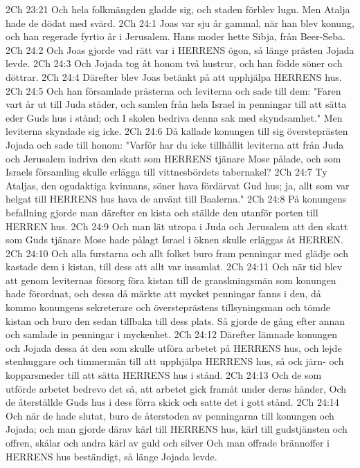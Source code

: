 2Ch 23:21  Och hela folkmängden gladde sig, och staden förblev lugn. Men Atalja hade de dödat med svärd.
2Ch 24:1  Joas var sju år gammal, när han blev konung, och han regerade fyrtio år i Jerusalem. Hans moder hette Sibja, från Beer-Seba.
2Ch 24:2  Och Joas gjorde vad rätt var i HERRENS ögon, så länge prästen Jojada levde.
2Ch 24:3  Och Jojada tog åt honom två hustrur, och han födde söner och döttrar.
2Ch 24:4  Därefter blev Joas betänkt på att upphjälpa HERRENS hus.
2Ch 24:5  Och han församlade prästerna och leviterna och sade till dem: "Faren vart år ut till Juda städer, och samlen från hela Israel in penningar till att sätta eder Guds hus i stånd; och I skolen bedriva denna sak med skyndsamhet." Men leviterna skyndade sig icke.
2Ch 24:6  Då kallade konungen till sig översteprästen Jojada och sade till honom: "Varför har du icke tillhållit leviterna att från Juda och Jerusalem indriva den skatt som HERRENS tjänare Mose pålade, och som Israels församling skulle erlägga till vittnesbördets tabernakel?
2Ch 24:7  Ty Ataljas, den ogudaktiga kvinnans, söner hava fördärvat Gud hus; ja, allt som var helgat till HERRENS hus hava de använt till Baalerna."
2Ch 24:8  På konungens befallning gjorde man därefter en kista och ställde den utanför porten till HERREN hus.
2Ch 24:9  Och man lät utropa i Juda och Jerusalem att den skatt som Guds tjänare Mose hade pålagt Israel i öknen skulle erläggas åt HERREN.
2Ch 24:10  Och alla furstarna och allt folket buro fram penningar med glädje och kastade dem i kistan, till dess att allt var insamlat.
2Ch 24:11  Och när tid blev att genom leviternas försorg föra kistan till de granskningsmän som konungen hade förordnat, och dessa då märkte att mycket penningar fanns i den, då kommo konungens sekreterare och översteprästens tillsyningsman och tömde kistan och buro den sedan tillbaka till dess plats. Så gjorde de gång efter annan och samlade in penningar i myckenhet.
2Ch 24:12  Därefter lämnade konungen och Jojada dessa åt den som skulle utföra arbetet på HERRENS hus, och lejde stenhuggare och timmermän till att upphjälpa HERRENS hus, så ock järn- och kopparsmeder till att sätta HERRENS hus i stånd.
2Ch 24:13  Och de som utförde arbetet bedrevo det så, att arbetet gick framåt under deras händer, Och de återställde Guds hus i dess förra skick och satte det i gott stånd.
2Ch 24:14  Och när de hade slutat, buro de återstoden av penningarna till konungen och Jojada; och man gjorde därav kärl till HERRENS hus, kärl till gudstjänsten och offren, skålar och andra kärl av guld och silver Och man offrade brännoffer i HERRENS hus beständigt, så länge Jojada levde.
